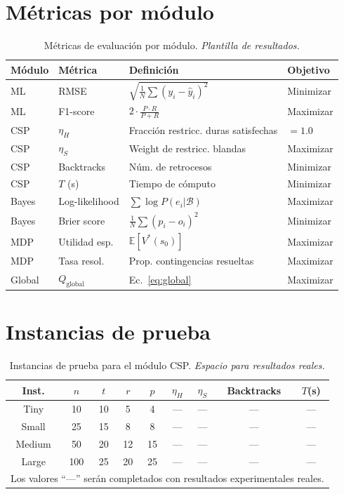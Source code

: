\documentclass[12pt,twoside]{report}
\theoremstyle{definition}
\begin{document}
\section{M\'etricas por m\'odulo}

\begin{table}[H]
\centering
\caption{M\'etricas de evaluaci\'on por m\'odulo. \textit{Plantilla de resultados.}}
\label{tab:metricas}
\begin{tabular}{llll}
\toprule
\textbf{M\'odulo} & \textbf{M\'etrica} & \textbf{Definici\'on} & \textbf{Objetivo} \\
\midrule
ML & RMSE & $\sqrt{\frac{1}{N}\sum(y_i-\hat{y}_i)^2}$ & Minimizar \\
ML & F1-score & $2\cdot\frac{P\cdot R}{P+R}$ & Maximizar \\
CSP & $\eta_H$ & Fracci\'on restricc. duras satisfechas & $=1.0$ \\
CSP & $\eta_S$ & Weight de restricc. blandas & Maximizar \\
CSP & Backtracks & N\'um. de retrocesos & Minimizar \\
CSP & $T$ (s) & Tiempo de c\'omputo & Minimizar \\
Bayes & Log-likelihood & $\sum \log P(e_i|\mathcal{B})$ & Maximizar \\
Bayes & Brier score & $\frac{1}{N}\sum(p_i-o_i)^2$ & Minimizar \\
MDP & Utilidad esp. & $\mathbb{E}[V^*(s_0)]$ & Maximizar \\
MDP & Tasa resol. & Prop. contingencias resueltas & Maximizar \\
Global & $Q_{\text{global}}$ & Ec.~\eqref{eq:global} & Maximizar \\
\bottomrule
\end{tabular}
\end{table}

\section{Instancias de prueba}

\begin{table}[H]
\centering
\caption{Instancias de prueba para el m\'odulo CSP. \textit{Espacio para resultados reales.}}
\label{tab:inst}
\begin{tabular}{ccccccccc}
\toprule
\textbf{Inst.} & $n$ & $t$ & $r$ & $p$ &
  $\eta_H$ & $\eta_S$ & Backtracks & $T$(s) \\
\midrule
Tiny   & 10  & 10 & 5  & 4  & --- & --- & --- & --- \\
Small  & 25  & 15 & 8  & 8  & --- & --- & --- & --- \\
Medium & 50  & 20 & 12 & 15 & --- & --- & --- & --- \\
Large  & 100 & 25 & 20 & 25 & --- & --- & --- & --- \\
\bottomrule
\multicolumn{9}{l}{\small Los valores ``---'' ser\'an completados con resultados experimentales reales.}
\end{tabular}
\end{table}
\end{document}

